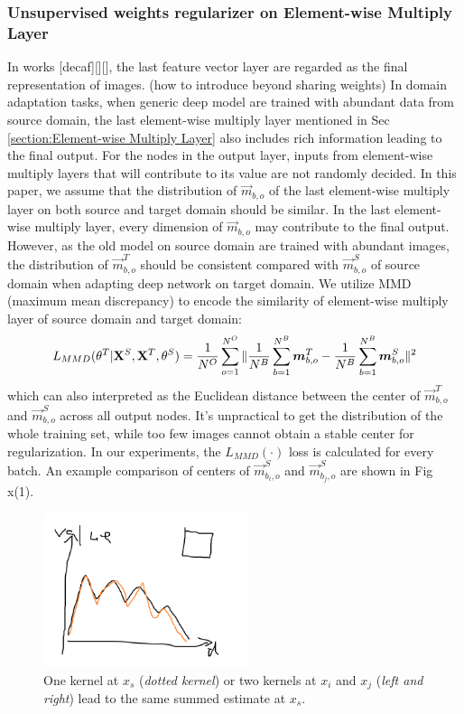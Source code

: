 \documentclass[runningheads]{llncs}
\begin{document}
\subsubsection{Unsupervised weights regularizer on Element-wise Multiply Layer}
In works [decaf][][], the last feature vector layer are regarded as the final representation of images. (how to introduce beyond sharing weights) In domain adaptation tasks, when generic deep model are trained with abundant data from source domain, the last element-wise multiply layer mentioned in Sec \ref{section:Element-wise Multiply Layer} also includes rich information leading to the final output. For the nodes in the output layer, inputs from element-wise multiply layers that will contribute to its value are not randomly decided. In this paper, we assume that the distribution of $\vec{m}_{b,o}$ of the last element-wise multiply layer on both source and target domain should be similar. In the last element-wise multiply layer, every dimension of $\vec{m}_{b,o}$ may contribute to the final output. However, as the old model on source domain are trained with abundant images, the distribution of $\vec{m}^{T}_{b,o}$ should be consistent compared with $\vec{m}^{S}_{b,o}$ of source domain when adapting deep network on target domain. We utilize MMD (maximum mean discrepancy) to encode the similarity of element-wise multiply layer of source domain and target domain:
\begin{equation}\label{equation:LMMD}
  L_{MMD}(\theta^{T}|{\bf X}^{S},{\bf X}^{T},\theta^{S}) = \frac{1}{N^{O}} \sum^{N^{O}}_{o=1}{\| \frac{1}{N^{B}}\sum^{N^{B}}_{b=1}{\vec{m}^{T}_{b,o}} - \frac{1}{N^{B}}\sum^{N^{B}}_{b=1}{\vec{m}^{S}_{b,o}} {\|}^{2}  }
\end{equation}
which can also interpreted as the Euclidean distance between the center of $\vec{m}^{T}_{b,o}$ and $\vec{m}^{S}_{b,o}$ across all output nodes. It's unpractical to get the distribution of the whole training set, while too few images cannot obtain a stable center for regularization. In our experiments, the $L_{MMD}(\cdot)$ loss is calculated for every batch. An example comparison of centers of $\vec{m}^{S}_{b_{i},o}$ and $\vec{m}^{S}_{b_{j},o}$ are shown in Fig x(1).

\begin{figure}
\centering
\includegraphics[height=4.5cm]{images/mmd.png}
\caption{One kernel at $x_s$ ({\it dotted kernel}) or two kernels at
$x_i$ and $x_j$ ({\it left and right}) lead to the same summed estimate
at $x_s$. }
\label{fig:example}
\end{figure}
\end{document}
